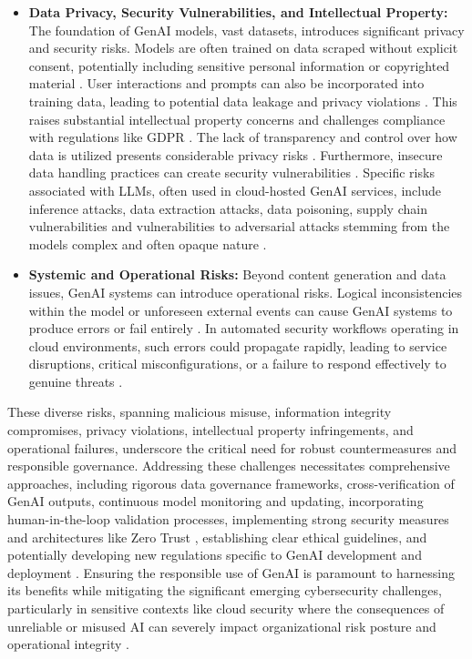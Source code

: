 \begin{itemize}
    \item \textbf{Data Privacy, Security Vulnerabilities, and Intellectual Property:} The foundation of GenAI models, vast datasets, introduces significant privacy and security risks. Models are often trained on data scraped without explicit consent, potentially including sensitive personal information or copyrighted material \cite{nyoto_cyber_2024}. User interactions and prompts can also be incorporated into training data, leading to potential data leakage and privacy violations \cite{nyoto_cyber_2024}. This raises substantial intellectual property concerns and challenges compliance with regulations like GDPR \cite{nyoto_cyber_2024}. The lack of transparency and control over how data is utilized presents considerable privacy risks \cite{nyoto_cyber_2024}. Furthermore, insecure data handling practices can create security vulnerabilities \cite{surathunmanun_exploring_2024}. Specific risks associated with LLMs, often used in cloud-hosted GenAI services, include inference attacks, data extraction attacks, data poisoning, supply chain vulnerabilities \cite{surathunmanun_exploring_2024} and vulnerabilities to adversarial attacks stemming from the models complex and often opaque nature \cite{dash_zero-trust_2024}.

    \item \textbf{Systemic and Operational Risks:} Beyond content generation and data issues, GenAI systems can introduce operational risks. Logical inconsistencies within the model or unforeseen external events can cause GenAI systems to produce errors or fail entirely \cite{surathunmanun_exploring_2024}. In automated security workflows operating in cloud environments, such errors could propagate rapidly, leading to service disruptions, critical misconfigurations, or a failure to respond effectively to genuine threats \cite{surathunmanun_exploring_2024}.
\end{itemize}

These diverse risks, spanning malicious misuse, information integrity compromises, privacy violations, intellectual property infringements, and operational failures, underscore the critical need for robust countermeasures and responsible governance. Addressing these challenges necessitates comprehensive approaches, including rigorous data governance frameworks, cross-verification of GenAI outputs, continuous model monitoring and updating, incorporating human-in-the-loop validation processes, implementing strong security measures \cite{surathunmanun_exploring_2024} and architectures like Zero Trust \cite{surathunmanun_exploring_2024, dash_zero-trust_2024}, establishing clear ethical guidelines, and potentially developing new regulations specific to GenAI development and deployment \cite{nyoto_cyber_2024}. Ensuring the responsible use of GenAI is paramount to harnessing its benefits while mitigating the significant emerging cybersecurity challenges, particularly in sensitive contexts like cloud security where the consequences of unreliable or misused AI can severely impact organizational risk posture and operational integrity \cite{surathunmanun_exploring_2024}.

